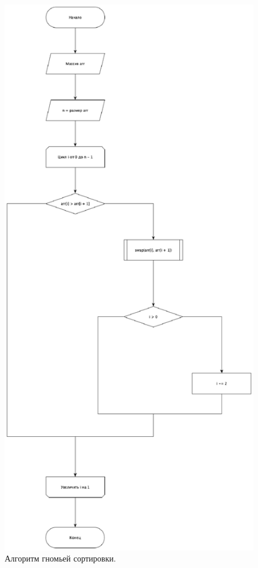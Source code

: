 \documentclass[12pt]{report}
\begin{document}
	\begin{figure}[H]
		\centering
		\includegraphics[width=0.7\linewidth]{Gnome}
		\caption{Алгоритм гномьей сортировки.}
		\label{ris:image2}
	\end{figure}

\newpage
\end{document}
